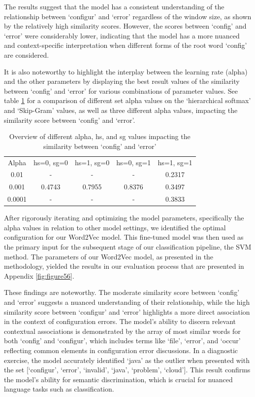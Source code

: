 \documentclass[english,bachelor]{swsLeipzig}
\begin{document}
The results suggest that the model has a consistent understanding of the relationship between `configur' 
and `error' regardless of the window size, as shown by the relatively high similarity scores. However, the scores between `config' and `error' were considerably lower, indicating that the model has a more nuanced and context-specific interpretation when different forms of the root word `config' are considered.

It is also noteworthy to highlight the interplay between the learning rate (alpha) and the other parameters by displaying the best result values of the similarity between `config' and `error' for various combinations of parameter values. See table \ref{tab:table51} for a comparison of different set alpha values on the `hierarchical softmax' and `Skip-Gram' values, as well as three different alpha values, impacting the similarity score between `config' and `error'.

\begin{table}[ht]
  \caption{Overview of different alpha, hs, and sg values impacting the similarity between `config' and `error'}
  \centering
  \begin{tabular}{c|cccc}\toprule
  Alpha & hs=0, sg=0 & hs=1, sg=0 & hs=0, sg=1 & hs=1, sg=1 \\ \cmidrule(l){1-5}
  0.01   & -       & -       & -       & 0.2317 \\
  0.001  & 0.4743  & 0.7955  & 0.8376  & 0.3497 \\
  0.0001 & -       & -       & -       & 0.3833 \\ \bottomrule
  \end{tabular}
  \label{tab:table51}
\end{table}

After rigorously iterating and optimizing the model parameters, specifically the alpha values in 
relation to other model settings, we identified the optimal configuration for our Word2Vec model. This fine-tuned model was then used as the primary input for the subsequent stage of our classification pipeline, the SVM method. The parameters of our Word2Vec model, as presented in the methodology, yielded the results in our evaluation process that are presented in Appendix \ref{fig:figure56}.

These findings are noteworthy. The moderate similarity score between `config' and `error' suggests a 
nuanced understanding of their relationship, while the high similarity score between `configur' and `error' highlights a more direct association in the context of configuration errors. The model's ability to discern relevant contextual associations is demonstrated by the array of most similar words for both `config' and `configur', which includes terms like `file', `error', and `occur' reflecting common elements in configuration error discussions. In a diagnostic exercise, the model accurately identified `java' as the outlier when presented with the set [`configur', `error', `invalid', `java', `problem', `cloud']. This result confirms the model's ability for semantic discrimination, which is crucial for nuanced language tasks such as classification.
\end{document}
